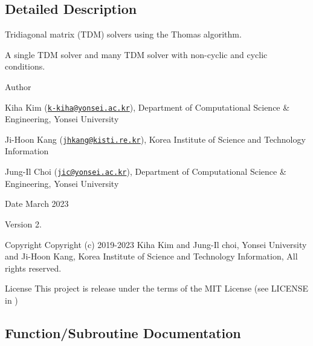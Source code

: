 \subsection{Detailed Description}
Tridiagonal matrix (T\+DM) solvers using the Thomas algorithm. 

A single T\+DM solver and many T\+DM solver with non-\/cyclic and cyclic conditions. \begin{DoxyAuthor}{Author}

\begin{DoxyItemize}
\item Kiha Kim (\href{mailto:k-kiha@yonsei.ac.kr}{\tt k-\/kiha@yonsei.\+ac.\+kr}), Department of Computational Science \& Engineering, Yonsei University
\item Ji-\/\+Hoon Kang (\href{mailto:jhkang@kisti.re.kr}{\tt jhkang@kisti.\+re.\+kr}), Korea Institute of Science and Technology Information
\item Jung-\/\+Il Choi (\href{mailto:jic@yonsei.ac.kr}{\tt jic@yonsei.\+ac.\+kr}), Department of Computational Science \& Engineering, Yonsei University
\end{DoxyItemize}
\end{DoxyAuthor}
\begin{DoxyDate}{Date}
March 2023 
\end{DoxyDate}
\begin{DoxyVersion}{Version}
2. 
\end{DoxyVersion}
\begin{DoxyParagraph}{Copyright}
Copyright (c) 2019-\/2023 Kiha Kim and Jung-\/\+Il choi, Yonsei University and Ji-\/\+Hoon Kang, Korea Institute of Science and Technology Information, All rights reserved. 
\end{DoxyParagraph}
\begin{DoxyParagraph}{License }
This project is release under the terms of the M\+IT License (see L\+I\+C\+E\+N\+SE in ) 
\end{DoxyParagraph}


\subsection{Function/\+Subroutine Documentation}
\mbox{\label{tdmas_8f90_a6c50d548eaa4b5e9b96ccbf8f65cb12a}} 
